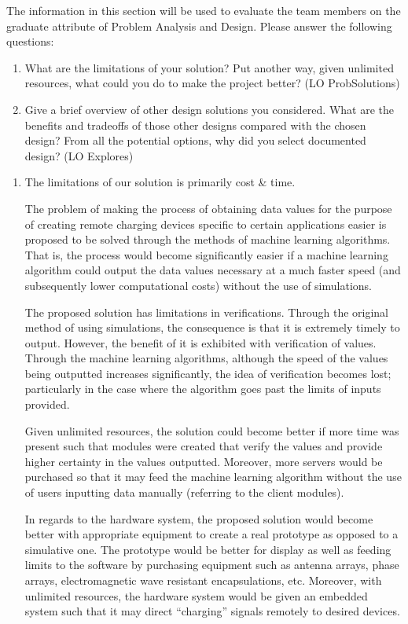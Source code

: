 \documentclass[12pt, titlepage]{article}
\begin{document}
The information in this section will be used to evaluate the team members on the graduate attribute of Problem Analysis and Design. Please answer the following questions: 
\par 
\begin{enumerate}
  \item What are the limitations of your solution? Put another way, given unlimited resources, what could you do to make the project better? (LO ProbSolutions) 
  \item Give a brief overview of other design solutions you considered. What are the benefits and tradeoffs of those other designs compared with the chosen design? From all the potential options, why did you select documented design? (LO Explores)
\end{enumerate}

\begin{enumerate}  
  \item The limitations of our solution is primarily cost \& time. \par The problem of making the process of obtaining data values for the purpose of creating remote charging devices specific to certain applications easier is proposed to be solved through the methods of machine learning algorithms. That is, the process would become significantly easier if a machine learning algorithm could output the data values necessary at a much faster speed (and subsequently lower computational costs) without the use of simulations. \par The proposed solution has limitations in verifications. Through the original method of using simulations, the consequence is that it is extremely timely to output. However, the benefit of it is exhibited with verification of values. Through the machine learning algorithms, although the speed of the values being outputted increases significantly, the idea of verification becomes lost; particularly in the case where the algorithm goes past the limits of inputs provided. \par Given unlimited resources, the solution could become better if more time was present such that modules were created that verify the values and provide higher certainty in the values outputted. 
  Moreover, more servers would be purchased so that it may feed the machine learning algorithm without the use of users inputting data manually (referring to the client modules). \par 
  In regards to the hardware system, the proposed solution would become better with appropriate equipment to create a real prototype as opposed to a simulative one. The prototype would be better for display as well as feeding limits to the software by purchasing equipment such as antenna arrays, phase arrays, electromagnetic wave resistant encapsulations, etc. Moreover, with unlimited resources, the hardware system would be given an embedded system such that it may direct “charging” signals remotely to desired devices.

\end{enumerate}
\end{document}
